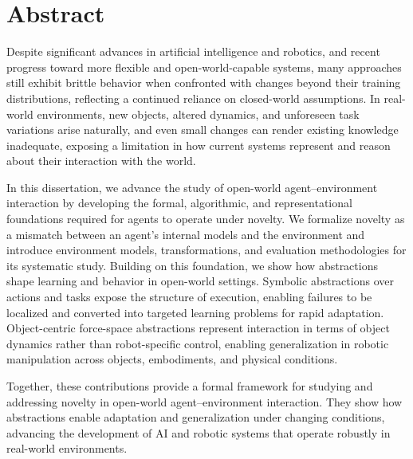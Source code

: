 \chapter*{Abstract}

Despite significant advances in artificial intelligence and robotics, and recent progress toward more flexible and open-world-capable systems, many approaches still exhibit brittle behavior when confronted with changes beyond their training distributions, reflecting a continued reliance on closed-world assumptions. In real-world environments, new objects, altered dynamics, and unforeseen task variations arise naturally, and even small changes can render existing knowledge inadequate, exposing a limitation in how current systems represent and reason about their interaction with the world.

In this dissertation, we advance the study of open-world agent--environment interaction by developing the formal, algorithmic, and representational foundations required for agents to operate under novelty. We formalize novelty as a mismatch between an agent’s internal models and the environment and introduce environment models, transformations, and evaluation methodologies for its systematic study.
Building on this foundation, we show how abstractions shape learning and behavior in open-world settings. Symbolic abstractions over actions and tasks expose the structure of execution, enabling failures to be localized and converted into targeted learning problems for rapid adaptation.
Object-centric force-space abstractions represent interaction in terms of object dynamics rather than robot-specific control, enabling generalization in robotic manipulation across objects, embodiments, and physical conditions.

Together, these contributions provide a formal framework for studying and addressing novelty in open-world agent--environment interaction. They show how abstractions enable adaptation and generalization under changing conditions, advancing the development of AI and robotic systems that operate robustly in real-world environments.
